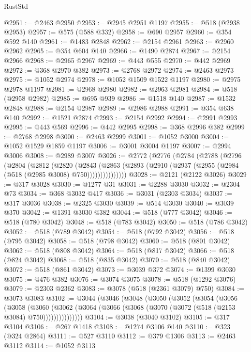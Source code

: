 \begin{lexlean}{RustStd}
\begin{coremodule}
@2951 := @2463 @2950
@2953 := @2945 @2951 @1197
@2955 := @518 (@2938 @2953)
@2957 := @575 (@588 @332)
@2958 := @690 @2957
@2960 := @354 @592 @140
@2961 := @1483 @2848
@2962 := @2154 @2961
@2963 := @2960 @2962
@2965 := @354 @604 @140
@2966 := @1490 @2874
@2967 := @2154 @2966
@2968 := @2965 @2967
@2969 := @443 @555
@2970 := @442 @2969
@2972 := @368 @2970 @382
@2973 := @2768 @2972
@2974 := @2463 @2973
@2975 := @1052 @2974
@2978 := @1052 @1509 @1522 @1197
@2980 := @2975 @2978 @1197
@2981 := @2968 @2980
@2982 := @2963 @2981
@2984 := @518 (@2958 @2982)
@2985 := @695 @939
@2986 := @1518 @140
@2987 := @1532 @2848
@2988 := @2154 @2987
@2989 := @2986 @2988
@2991 := @354 @638 @140
@2992 := @1521 @2874
@2993 := @2154 @2992
@2994 := @2991 @2993
@2995 := @443 @569
@2996 := @442 @2995
@2998 := @368 @2996 @382
@2999 := @2768 @2998
@3000 := @2463 @2999
@3001 := @1052 @3000
@3004 := @1052 @1529 @1859 @1197
@3006 := @3001 @3004 @1197
@3007 := @2994 @3006
@3008 := @2989 @3007
@3026 := @2772
    (@2776
      (@2784
        (@2788
          (@2796
            (@2804
              (@2812
                (@2820
                  (@2843
                    (@2863
                      (@2893 (@2910 (@2937 (@2955 (@2984 (@518 (@2985 @3008) @750)))))))))))))))
@3028 := @2121 (@2122 @3026)
@3029 := @317 @3028
@3030 := @1277 @31
@3031 := @2288 @3030
@3032 := @2304 @73
@3034 := @368 @3032 @417
@3036 := @3031 (@2303 @3034)
@3037 := @317 @3036
@3038 := @2325 @3030
@3039 := @514 @3030
@3040 := @3039 @370
@3042 := @1391 @3030 @382
@3044 := @518 (@777 @3042)
@3046 := @518 (@780 @3042)
@3048 := @518 (@783 @3042)
@3050 := @518 (@786 @3042)
@3052 := @518 (@789 @3042)
@3054 := @518 (@792 @3042)
@3056 := @518 (@795 @3042)
@3058 := @518 (@798 @3042)
@3060 := @518 (@801 @3042)
@3062 := @518 (@808 @3042)
@3064 := @518 (@817 @3042)
@3066 := @518 (@824 @3042)
@3068 := @518 (@835 @3042)
@3070 := @518 (@840 @3042)
@3072 := @518 (@861 @3042)
@3073 := @3039 @372
@3074 := @1399 @3030
@3075 := @476 @382
@3076 := @3074 @3075
@3078 := @518 (@1292 @3076)
@3079 := @2303 @2362
@3083 := @3078 (@518 (@2361 @3079) @750)
@3084 := @3073 @3083
@3102 := @3044
    (@3046
      (@3048
        (@3050
          (@3052
            (@3054
              (@3056
                (@3058
                  (@3060
                    (@3062
                      (@3064 (@3066 (@3068 (@3070 (@3072 (@518 (@2153 @3084) @750)))))))))))))))
@3104 := @3038 (@3040 @3102)
@3105 := @317 @3104
@3106 := @267 @1418
@3108 := @1274 @3106 @140
@3110 := @323 (@324 @2864)
@3111 := @527 @3110
@3112 := @379 @1306
@3113 := @2463 @3112
@3114 := @1052 @3113

\end{coremodule}
\end{lexlean}
